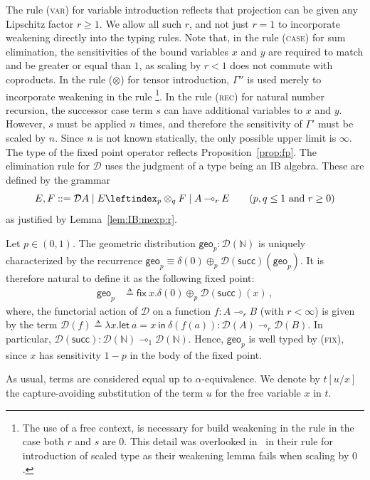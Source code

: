 \documentclass[a4paper,UKenglish,cleveref, autoref, thm-restate]{lipics-v2021}
\newcommand{\lol}{\mathbin{\multimap}}
\newcommand{\mprod}{\otimes}
\newcommand{\nat}{\mathbb{N}}
\newcommand{\pair}[2]{\otimes_{#1,#2}}
\renewcommand{\pair}[2]{\leftindex_{#1}\otimes_{#2}} %
\newcommand{\geo}[1][p]{\mathsf{geo}_{#1}}
\newcommand{\letIn}[2]{\mathsf{let~} #1 \mathsf{~in~} #2}
\newcommand{\fix}[2]{\mathsf{fix~} #1 . #2 }
\newcommand{\Succbare}{\mathsf{succ}}
\newcommand{\TD}{\mathcal{D}}
\newcommand{\jeq}{\equiv}
\newcommand{\defeq}{\triangleq}
\begin{document}
The rule (\textsc{var}) for variable introduction reflects that projection can be given any Lipschitz factor $r\geq 1$. We allow
all such $r$, and not just $r=1$ to incorporate weakening directly into the typing rules. 
Note that, in the rule (\textsc{case}) for sum elimination, the sensitivities of the bound variables $x$ and $y$ are required to match and be greater or equal than $1$, as scaling by $r<1$ does not commute with coproducts.
In the rule ($\mprod$) for tensor introduction, $\Gamma''$ is used merely to incorporate weakening in the rule%
\footnote{The use of a free context, is necessary for build weakening in the rule in the case both $r$ and $s$ are $0$. This detail was overlooked in~\cite{AmorimGHKC17} in their rule for introduction of scaled type as their weakening lemma fails when scaling by $0$.}. 
In the rule (\textsc{rec}) for natural number recursion, the successor case term $s$ can have additional variables to $x$ and $y$. However, 
$s$ must be applied $n$ times, and therefore the sensitivity of $\Gamma'$ must be scaled by $n$. Since $n$ is not known statically, %
the only possible upper limit is $\infty$. The type of the fixed point operator reflects Proposition~\ref{prop:fp}. The elimination rule for $\TD$ uses the judgment of a type being an IB algebra. These are defined by the grammar 
\[
 E,F ::= \TD A \mid E \pair{p}{q} F \mid A\lol_r E  
 \qquad \text{($p,q \leq 1$ and $r\geq 0$)}
\]
as justified by Lemma~\ref{lem:IB:mexp:r}.

\begin{example} \label{example:geo:calc}
Let $p \in (0,1)$.
The geometric distribution $\geo : \TD(\nat)$ is uniquely characterized by the recurrence $\geo \jeq \delta(0) \oplus_p \TD(\Succbare)(\geo)$. It is therefore natural to define it as the following fixed point:
\begin{align*}
\geo &\defeq \fix x \delta(0) \oplus_p\TD(\Succbare)(x) \,,
\end{align*}
where, the functorial action of $\TD$ on a function $f \colon A \lol_r B$ (with $r < \infty$) is given by the term $\TD(f) \defeq \lambda x. \letIn{a=x}{\delta(f(a))} \colon \TD(A) \lol_r \TD(B)$. In particular, $\TD(\Succbare) \colon \TD(\nat) \lol_1 \TD(\nat)$. Hence, $\geo$ is well typed by (\textsc{fix}), since $x$ has sensitivity $1-p$ in the body of the fixed point.
\end{example}

As usual, terms are considered equal up to $\alpha$-equivalence.
We denote by $t[u/x]$ the capture-avoiding substitution of the term $u$ for the free variable $x$ in $t$. 
\end{document}

